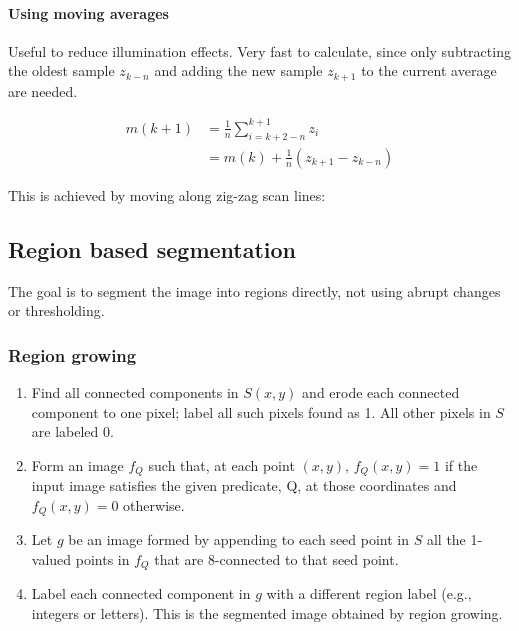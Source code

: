 \paragraph{Using moving averages}
Useful to reduce illumination effects.
Very fast to calculate, since only subtracting the oldest sample $z_{k-n}$ and
adding the new sample $z_{k+1}$ to the current average are needed.

\begin{align*}
	m(k+1) &= \frac{1}{n} \sum_{i=k+2-n}^{k+1} z_i \\
	&= m(k) + \frac{1}{n}(z_{k+1}-z_{k-n})
\end{align*}

This is achieved by moving along zig-zag scan lines:
\begin{center}
\end{center}


\subsection{Region based segmentation}
The goal is to segment the image into regions directly, not using abrupt changes or thresholding.
\subsubsection{Region growing}
\begin{enumerate}
\item Find all connected components in $S(x,y)$ and erode each connected component to one pixel; label all such pixels found as 1. All other pixels in $S$ are labeled 0.
\item Form an image $f_Q$ such that, at each point $(x,y)$, $f_Q(x,y)=1$ if the input image satisfies the given predicate, Q, at those coordinates and $f_Q(x,y)=0$ otherwise.
\item Let $g$ be an image formed by appending to each seed point in $S$ all the 1-valued points in $f_Q$ that are 8-connected to that seed point.
\item Label each connected component in $g$ with a different region label (e.g., integers or letters). This is the segmented image obtained by region growing.
\end{enumerate}
